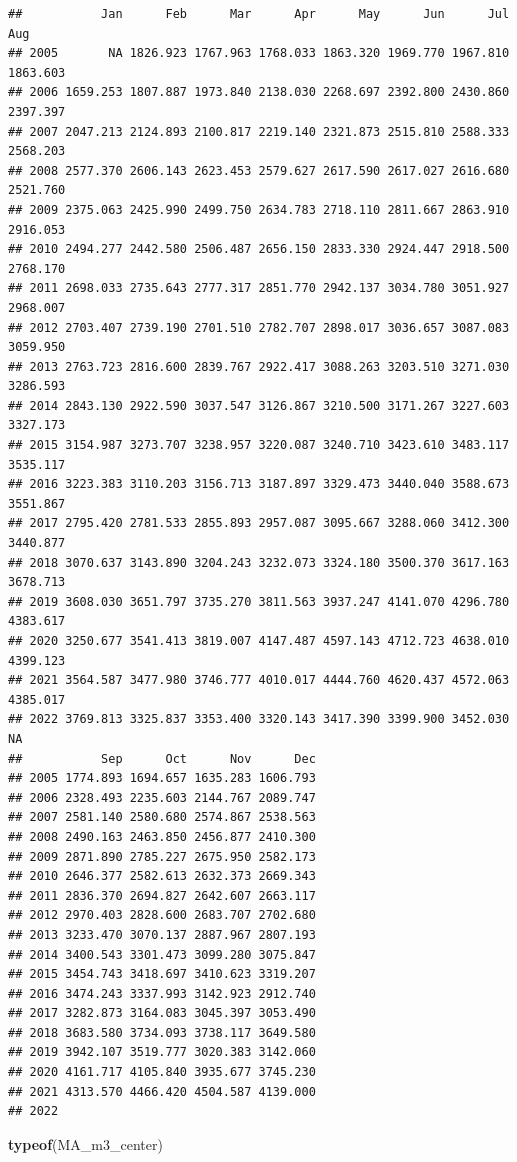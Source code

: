 \documentclass[
]{article}
\newenvironment{Shaded}{\begin{snugshade}}{\end{snugshade}}
\newcommand{\FunctionTok}[1]{\textcolor[rgb]{0.13,0.29,0.53}{\textbf{#1}}}
\newcommand{\NormalTok}[1]{#1}
\begin{document}
\begin{verbatim}
##           Jan      Feb      Mar      Apr      May      Jun      Jul      Aug
## 2005       NA 1826.923 1767.963 1768.033 1863.320 1969.770 1967.810 1863.603
## 2006 1659.253 1807.887 1973.840 2138.030 2268.697 2392.800 2430.860 2397.397
## 2007 2047.213 2124.893 2100.817 2219.140 2321.873 2515.810 2588.333 2568.203
## 2008 2577.370 2606.143 2623.453 2579.627 2617.590 2617.027 2616.680 2521.760
## 2009 2375.063 2425.990 2499.750 2634.783 2718.110 2811.667 2863.910 2916.053
## 2010 2494.277 2442.580 2506.487 2656.150 2833.330 2924.447 2918.500 2768.170
## 2011 2698.033 2735.643 2777.317 2851.770 2942.137 3034.780 3051.927 2968.007
## 2012 2703.407 2739.190 2701.510 2782.707 2898.017 3036.657 3087.083 3059.950
## 2013 2763.723 2816.600 2839.767 2922.417 3088.263 3203.510 3271.030 3286.593
## 2014 2843.130 2922.590 3037.547 3126.867 3210.500 3171.267 3227.603 3327.173
## 2015 3154.987 3273.707 3238.957 3220.087 3240.710 3423.610 3483.117 3535.117
## 2016 3223.383 3110.203 3156.713 3187.897 3329.473 3440.040 3588.673 3551.867
## 2017 2795.420 2781.533 2855.893 2957.087 3095.667 3288.060 3412.300 3440.877
## 2018 3070.637 3143.890 3204.243 3232.073 3324.180 3500.370 3617.163 3678.713
## 2019 3608.030 3651.797 3735.270 3811.563 3937.247 4141.070 4296.780 4383.617
## 2020 3250.677 3541.413 3819.007 4147.487 4597.143 4712.723 4638.010 4399.123
## 2021 3564.587 3477.980 3746.777 4010.017 4444.760 4620.437 4572.063 4385.017
## 2022 3769.813 3325.837 3353.400 3320.143 3417.390 3399.900 3452.030       NA
##           Sep      Oct      Nov      Dec
## 2005 1774.893 1694.657 1635.283 1606.793
## 2006 2328.493 2235.603 2144.767 2089.747
## 2007 2581.140 2580.680 2574.867 2538.563
## 2008 2490.163 2463.850 2456.877 2410.300
## 2009 2871.890 2785.227 2675.950 2582.173
## 2010 2646.377 2582.613 2632.373 2669.343
## 2011 2836.370 2694.827 2642.607 2663.117
## 2012 2970.403 2828.600 2683.707 2702.680
## 2013 3233.470 3070.137 2887.967 2807.193
## 2014 3400.543 3301.473 3099.280 3075.847
## 2015 3454.743 3418.697 3410.623 3319.207
## 2016 3474.243 3337.993 3142.923 2912.740
## 2017 3282.873 3164.083 3045.397 3053.490
## 2018 3683.580 3734.093 3738.117 3649.580
## 2019 3942.107 3519.777 3020.383 3142.060
## 2020 4161.717 4105.840 3935.677 3745.230
## 2021 4313.570 4466.420 4504.587 4139.000
## 2022
\end{verbatim}

\begin{Shaded}
\begin{Highlighting}[]
\FunctionTok{typeof}\NormalTok{(MA\_m3\_center)}
\end{Highlighting}
\end{Shaded}
\end{document}
